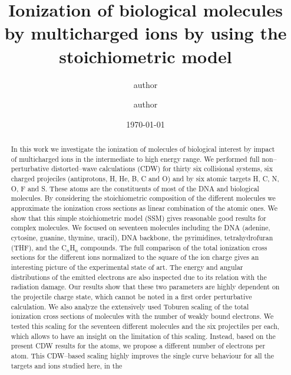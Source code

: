 \documentclass[preprint]{revtex4-2}
\begin{document}
\title{Ionization of biological molecules by multicharged ions by using 
the stoichiometric model}

\author{author}
\address{Instituto de Astronom\'{\i}a y F\'{\i}sica del Espacio 
(CONICET-UBA).
Casilla de correo 67, sucursal 28 (C1428EGA) Buenos Aires, Argentina.}
\author{author}

\date{\today}%

\begin{abstract}
In this work we investigate the ionization of molecules of biological 
interest by impact of multicharged ions in the intermediate to high 
energy range. We performed full non--perturbative distorted--wave 
calculations (CDW) for thirty six collisional systems, six charged projeciles 
(antiprotons, H, He, B, C and O) and by six atomic targets H, C, N, O, 
F and S. These atoms are the constituents of most of the DNA and 
biological molecules. By considering the stoichiometric composition of 
the different molecules we approximate the ionization cross sections 
as linear combination of the atomic ones.  We show that this simple 
stoichiometric model (SSM) gives reasonable good results for complex 
molecules. We focused on seventeen molecules including the DNA 
(adenine, cytosine, guanine, thymine, uracil), DNA backbone, the 
pyrimidines, tetrahydrofuran (THF), and the C$_n$H$_n$ compounds. The 
full comparison of 
the total ionization cross sections for the different ions normalized 
to the square of the ion charge gives an interesting picture of the
experimental state of art. The energy and angular distributions of the 
emitted electrons are also inspected due to its relation with the 
radiation damage. Our results show that these two parameters are highly 
dependent on the projectile charge state, which cannot be noted in a
first order perturbative calculation. We also analyze the extensively 
used Toburen 
scaling of the total ionization cross sections of molecules with the 
number of weakly bound electrons. We tested this scaling for the seventeen 
different molecules and the six projectiles per each, which allows to 
have an insight on the limitation of this scaling. Instead, based on 
the present CDW results for the atoms, we propose a different number 
of electrons per atom. This CDW--based scaling highly improves the 
single curve behaviour for all the targets and ions studied here, in the 

\end{abstract}
\end{document}
